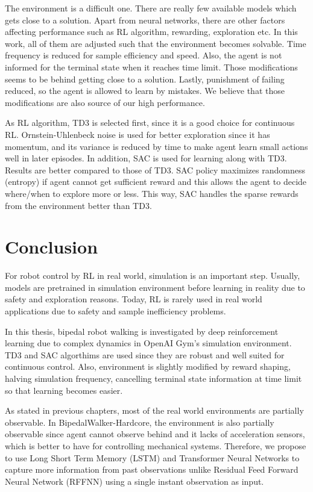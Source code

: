\documentclass[a4paper, 12pt]{article} %
\begin{document}
The environment is a difficult one. 
There are really few available models which gets close to a solution. 
Apart from neural networks, there are other factors affecting performance such as RL algorithm, rewarding, exploration etc. 
In this work, all of them are adjusted such that the environment becomes solvable. 
Time frequency is reduced for sample efficiency and speed. 
Also, the agent is not informed for the terminal state when it reaches time limit. 
Those modifications seems to be behind getting close to a solution. 
Lastly, punishment of failing reduced, so the agent is allowed to learn by mistakes. 
We believe that those modifications are also source of our high performance. 

As RL algorithm, TD3 is selected first, since it is a good choice for continuous RL. 
Ornstein-Uhlenbeck noise is used for better exploration since it has momentum, and its variance is reduced by time to make agent learn small actions well in later episodes. 
In addition, SAC is used for learning along with TD3. 
Results are better compared to those of TD3. 
SAC policy maximizes randomness (entropy) if agent cannot get sufficient reward and this allows the agent to decide where/when to explore more or less. 
This way, SAC handles the sparse rewards from the environment better than TD3. 

\section{Conclusion}

For robot control by RL in real world, simulation is an important step. 
Usually, models are pretrained in simulation environment before learning in reality due to safety and exploration reasons. 
Today, RL is rarely used in real world applications due to safety and sample inefficiency problems. 

In this thesis, bipedal robot walking is investigated by deep  reinforcement learning due to complex dynamics in OpenAI Gym's simulation environment. 
TD3 and SAC algorthims are used since they are robust and well suited for continuous control. 
Also, environment is slightly modified by reward shaping, halving simulation frequency, cancelling terminal state information at time limit so that learning becomes easier.

As stated in previous chapters, most of the real world environments are partially observable. 
In BipedalWalker-Hardcore, the environment is also partially observable since agent cannot observe behind and it lacks of acceleration sensors, which is better to have for controlling mechanical systems. 
Therefore, we propose to use Long Short Term Memory (LSTM) and Transformer Neural Networks to capture more information from past observations unlike Residual Feed Forward Neural Network (RFFNN) using a single instant observation as input. 
\end{document}
